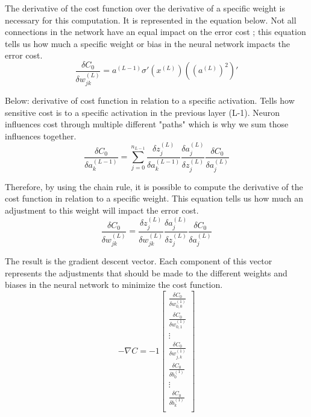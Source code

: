 \documentclass[12pt,a4paper,notitlepage]{article}
\begin{document}
The derivative of the cost function over the derivative of a specific weight is necessary for this computation. It is represented in the equation below. Not all connections in the network have an equal impact on the error cost ; this equation tells us how much a specific weight or bias in the neural network impacts the error cost.
\begin{displaymath}
	\frac{\delta C_0}{\delta w_{jk}^{(L)}} = a^{(L-1)} \sigma\prime(x^{(L)})((a^{(L)})^2)\prime
\end{displaymath}

Below: derivative of cost function in relation to a specific activation. Tells how sensitive cost is to a specific activation in the previous layer (L-1). Neuron influences cost through multiple different "paths" which is why we sum those influences together.
\begin{displaymath}
	\frac{\delta C_0}{\delta a_{k}^{(L-1)}} = 
	\sum_{j=0}^{n_{L-1}}
	\frac{\delta z_j^{(L)}}{\delta a_{k}^{(L-1)}}
	\frac{\delta a_j^{(L)}}{\delta z_j^{(L)}}
	\frac{\delta C_0}{\delta a_j^{(L)}}
\end{displaymath}

Therefore, by using the chain rule, it is possible to compute the derivative of the cost function in relation to a specific weight. This equation tells us how much an adjustment to this weight will impact the error cost.
\begin{displaymath}
	\frac{\delta C_0}{\delta w_{jk}^{(L)}} = 
	\frac{\delta z_j^{(L)}}{\delta w_{jk}^{(L)}}
	\frac{\delta a_j^{(L)}}{\delta z_j^{(L)}}
	\frac{\delta C_0}{\delta a_j^{(L)}}
\end{displaymath}

The result is the gradient descent vector. Each component of this vector represents the adjustments that should be made to the different weights and biases in the neural network to minimize the cost function.
\begin{displaymath}
	-\nabla C =
	-1 \begin{bmatrix}
		\frac{\delta C_0}{\delta w_{0,0}^{(1)}}\\
		\frac{\delta C_0}{\delta w_{0,1}^{(1)}}\\
		\vdots\\
		\frac{\delta C_0}{\delta w_{j,k}^{(1)}}\\
		\frac{\delta C_0}{\delta b_{0}^{(1)}}\\
		\vdots\\
		\frac{\delta C_0}{\delta b_{k}^{(1)}}\\
	\end{bmatrix}
\end{displaymath}
\end{document}
